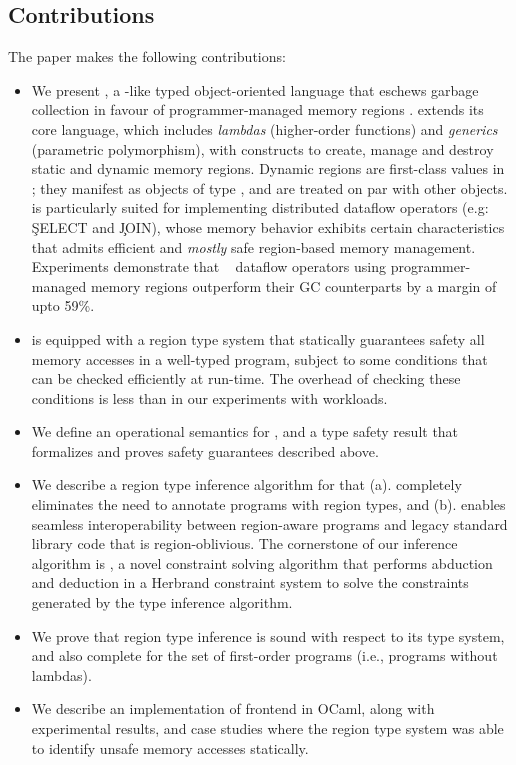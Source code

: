 \subsection*{Contributions}

The paper makes the following contributions:

\begin{itemize}
  \item We present \name, a \csharp-like typed object-oriented language
  that eschews garbage collection in favour of programmer-managed
  memory regions . \name extends its core language, which includes
  \emph{lambdas} (higher-order functions) and \emph{generics}
  (parametric polymorphism), with constructs to create, manage and
  destroy static and dynamic memory regions. Dynamic regions are
  first-class values in \name; they manifest as objects of type
  , and are treated on par with other objects. \name is
  particularly suited for implementing distributed dataflow operators
  (e.g: \c{SELECT} and \c{JOIN}), whose memory behavior exhibits
  certain characteristics that admits efficient and \emph{mostly} safe
  region-based memory management. Experiments demonstrate that
  \naiad~\cite{naiad} dataflow operators using programmer-managed
  memory regions outperform their GC counterparts by a margin of upto
  59\%. 

  \item \name is equipped with a region type system that statically
  guarantees safety all memory accesses in a well-typed program,
  subject to some conditions that can be checked efficiently at
  run-time. The overhead of checking these conditions is less than
   in our experiments with \naiad workloads.

  \item We define an operational semantics for \name, and a type
  safety result that formalizes and proves safety guarantees described
  above.

  \item We describe a region type inference algorithm for \name that
  (a). completely eliminates the need to annotate \name programs with
  region types, and (b). enables seamless interoperability between
  region-aware \name programs and legacy standard library code that is
  region-oblivious. The cornerstone of our inference algorithm is
  \csolve, a novel constraint solving algorithm that performs
  abduction and deduction in a Herbrand constraint system to solve the
  constraints generated by the type inference algorithm.

  \item We prove that region type inference is sound with respect to
  its type system, and also complete for the set of first-order
  programs (i.e., programs without lambdas). 

  \item We describe an implementation of \name frontend in OCaml,
  along with experimental results, and case studies where the region
  type system was able to identify unsafe memory accesses statically.
  
\end{itemize}

